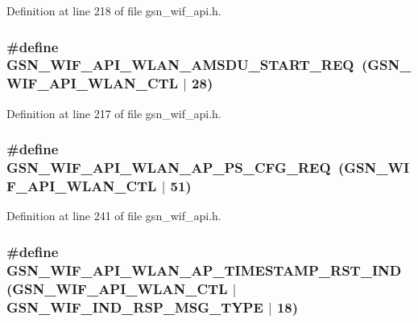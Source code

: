 Definition at line 218 of file gsn\_\-wif\_\-api.h.

\hypertarget{a00606_aac0a14ca8e9e988f133dfcdb7b497a2f}{
\subsubsection[{GSN\_\-WIF\_\-API\_\-WLAN\_\-AMSDU\_\-START\_\-REQ}]{\setlength{\rightskip}{0pt plus 5cm}\#define GSN\_\-WIF\_\-API\_\-WLAN\_\-AMSDU\_\-START\_\-REQ~(GSN\_\-WIF\_\-API\_\-WLAN\_\-CTL $|$ 28)}}
\label{a00606_aac0a14ca8e9e988f133dfcdb7b497a2f}


Definition at line 217 of file gsn\_\-wif\_\-api.h.

\hypertarget{a00606_ac6965464db6080ed747aa8ddcea38fa4}{
\subsubsection[{GSN\_\-WIF\_\-API\_\-WLAN\_\-AP\_\-PS\_\-CFG\_\-REQ}]{\setlength{\rightskip}{0pt plus 5cm}\#define GSN\_\-WIF\_\-API\_\-WLAN\_\-AP\_\-PS\_\-CFG\_\-REQ~(GSN\_\-WIF\_\-API\_\-WLAN\_\-CTL $|$ 51)}}
\label{a00606_ac6965464db6080ed747aa8ddcea38fa4}


Definition at line 241 of file gsn\_\-wif\_\-api.h.

\hypertarget{a00606_ae8ecda1d37b7e28222baad4442fcbdcb}{
\subsubsection[{GSN\_\-WIF\_\-API\_\-WLAN\_\-AP\_\-TIMESTAMP\_\-RST\_\-IND}]{\setlength{\rightskip}{0pt plus 5cm}\#define GSN\_\-WIF\_\-API\_\-WLAN\_\-AP\_\-TIMESTAMP\_\-RST\_\-IND~(GSN\_\-WIF\_\-API\_\-WLAN\_\-CTL $|$ GSN\_\-WIF\_\-IND\_\-RSP\_\-MSG\_\-TYPE $|$ 18)}}
\label{a00606_ae8ecda1d37b7e28222baad4442fcbdcb}


